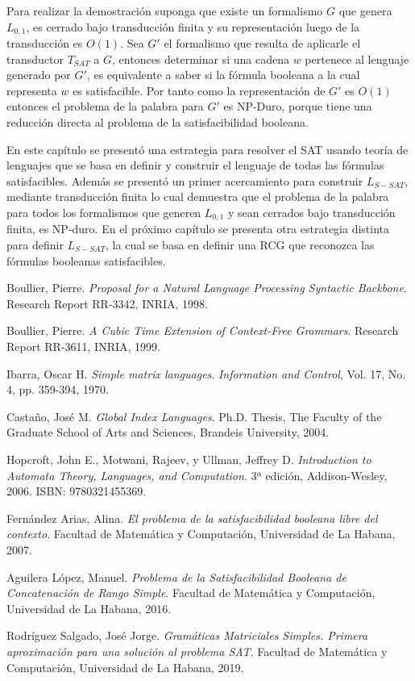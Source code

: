 \documentclass[12pt]{article}
\begin{document}
Para realizar la demostración suponga que existe un formalismo $G$ que genera $L_{0,1}$, es cerrado bajo transducción finita y su representación 
luego de la transducción es $O(1)$. 
Sea $G'$ el formalismo que resulta de aplicarle el transductor $T_{SAT}$ a $G$, entonces determinar 
si una cadena $w$ pertenece al lenguaje generado por $G'$, es equivalente a saber si la fórmula
booleana a la cual representa $w$ es satisfacible. Por tanto como la representación de $G'$ es $O(1)$
entonces el problema de la palabra para $G'$ es NP-Duro, porque tiene una reducción directa al problema
de la satisfacibilidad booleana.

En este capítulo se presentó una estrategia para resolver el SAT usando teoría de lenguajes que se basa en 
definir y construir el lenguaje de todas las fórmulas satisfacibles. Además se presentó un primer acercamiento 
para construir $L_{S-SAT}$, mediante transducción finita lo cual demuestra que el problema de la palabra para 
todos los formalismos que generen $L_{0,1}$ y sean cerrados bajo transducción finita, es NP-duro. 
En el próximo capítulo se presenta otra estrategia distinta para definir $L_{S-SAT}$, la cual se 
basa en definir una RCG que reconozca las fórmulas booleanas satisfacibles. 


\begin{thebibliography}{99}
    
    Boullier, Pierre.
    \textit{Proposal for a Natural Language Processing Syntactic Backbone}.
    Research Report RR-3342, INRIA, 1998.
    
    Boullier, Pierre.
    \textit{A Cubic Time Extension of Context-Free Grammars}.
    Research Report RR-3611, INRIA, 1999.
    
    Ibarra, Oscar H.
    \textit{Simple matrix languages}.
    \textit{Information and Control}, Vol. 17, No. 4, pp. 359-394, 1970.
    
    Castaño, José M.
    \textit{Global Index Languages}.
    Ph.D. Thesis, The Faculty of the Graduate School of Arts and Sciences, Brandeis University, 2004.
    
    Hopcroft, John E., Motwani, Rajeev, y Ullman, Jeffrey D.
    \textit{Introduction to Automata Theory, Languages, and Computation}.
    3ª edición, Addison-Wesley, 2006. ISBN: 9780321455369.
    
    Fernández Arias, Alina.
    \textit{El problema de la satisfacibilidad booleana libre del contexto}.
    Facultad de Matemática y Computación, Universidad de La Habana, 2007.
    
    Aguilera López, Manuel.
    \textit{Problema de la Satisfacibilidad Booleana de Concatenación de Rango Simple}.
    Facultad de Matemática y Computación, Universidad de La Habana, 2016.
    
    Rodríguez Salgado, José Jorge.
    \textit{Gramáticas Matriciales Simples. Primera aproximación para una solución al problema SAT}.
    Facultad de Matemática y Computación, Universidad de La Habana, 2019.
    
\end{thebibliography}
\end{document}
